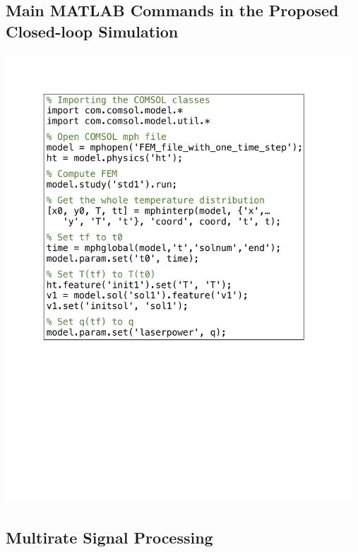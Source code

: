 \documentclass [11pt, proquest] {uwthesis}[2020/02/24]
\begin{document}
 
\chapter{}

\section{Main MATLAB Commands in the Proposed Closed-loop Simulation} \label{chapA:MATLAB-commands-closed-loop-simulation}

\begin{center}
\includegraphics[width=13cm]{Closed-loop-simulation/pseudocode_simplified}
\par\end{center}


\section{Multirate Signal Processing} \label{secA:Multirate-Signal-Processing}
\end{document}
